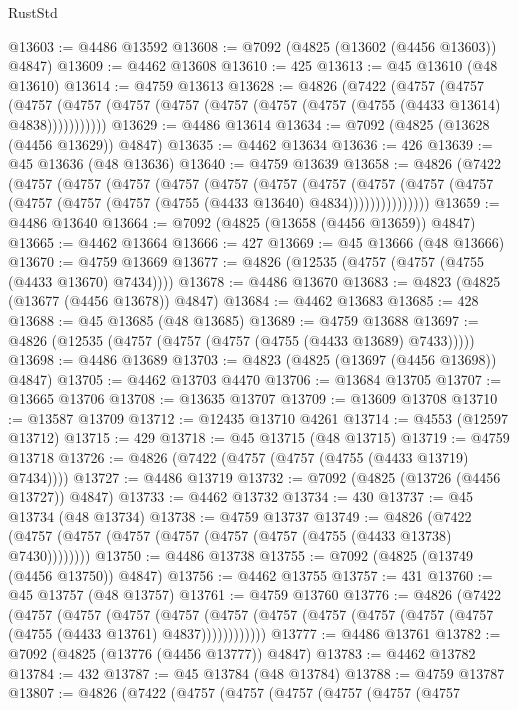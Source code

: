 \begin{lexlean}{RustStd}
\begin{coremodule}
@13603 := @4486 @13592
@13608 := @7092 (@4825 (@13602 (@4456 @13603)) @4847)
@13609 := @4462 @13608
@13610 := 425
@13613 := @45 @13610 (@48 @13610)
@13614 := @4759 @13613
@13628 := @4826
    (@7422
      (@4757
        (@4757
          (@4757 (@4757 (@4757 (@4757 (@4757 (@4757 (@4757 (@4755 (@4433 @13614) @4838)))))))))))
@13629 := @4486 @13614
@13634 := @7092 (@4825 (@13628 (@4456 @13629)) @4847)
@13635 := @4462 @13634
@13636 := 426
@13639 := @45 @13636 (@48 @13636)
@13640 := @4759 @13639
@13658 := @4826
    (@7422
      (@4757
        (@4757
          (@4757
            (@4757
              (@4757
                (@4757
                  (@4757
                    (@4757
                      (@4757 (@4757 (@4757 (@4757 (@4757 (@4755 (@4433 @13640) @4834)))))))))))))))
@13659 := @4486 @13640
@13664 := @7092 (@4825 (@13658 (@4456 @13659)) @4847)
@13665 := @4462 @13664
@13666 := 427
@13669 := @45 @13666 (@48 @13666)
@13670 := @4759 @13669
@13677 := @4826 (@12535 (@4757 (@4757 (@4755 (@4433 @13670) @7434))))
@13678 := @4486 @13670
@13683 := @4823 (@4825 (@13677 (@4456 @13678)) @4847)
@13684 := @4462 @13683
@13685 := 428
@13688 := @45 @13685 (@48 @13685)
@13689 := @4759 @13688
@13697 := @4826 (@12535 (@4757 (@4757 (@4757 (@4755 (@4433 @13689) @7433)))))
@13698 := @4486 @13689
@13703 := @4823 (@4825 (@13697 (@4456 @13698)) @4847)
@13705 := @4462 @13703 @4470
@13706 := @13684 @13705
@13707 := @13665 @13706
@13708 := @13635 @13707
@13709 := @13609 @13708
@13710 := @13587 @13709
@13712 := @12435 @13710 @4261
@13714 := @4553 (@12597 @13712)
@13715 := 429
@13718 := @45 @13715 (@48 @13715)
@13719 := @4759 @13718
@13726 := @4826 (@7422 (@4757 (@4757 (@4755 (@4433 @13719) @7434))))
@13727 := @4486 @13719
@13732 := @7092 (@4825 (@13726 (@4456 @13727)) @4847)
@13733 := @4462 @13732
@13734 := 430
@13737 := @45 @13734 (@48 @13734)
@13738 := @4759 @13737
@13749 := @4826 (@7422 (@4757 (@4757 (@4757 (@4757 (@4757 (@4757 (@4755 (@4433 @13738) @7430))))))))
@13750 := @4486 @13738
@13755 := @7092 (@4825 (@13749 (@4456 @13750)) @4847)
@13756 := @4462 @13755
@13757 := 431
@13760 := @45 @13757 (@48 @13757)
@13761 := @4759 @13760
@13776 := @4826
    (@7422
      (@4757
        (@4757
          (@4757
            (@4757 (@4757 (@4757 (@4757 (@4757 (@4757 (@4757 (@4755 (@4433 @13761) @4837))))))))))))
@13777 := @4486 @13761
@13782 := @7092 (@4825 (@13776 (@4456 @13777)) @4847)
@13783 := @4462 @13782
@13784 := 432
@13787 := @45 @13784 (@48 @13784)
@13788 := @4759 @13787
@13807 := @4826
    (@7422
      (@4757
        (@4757
          (@4757
            (@4757
              (@4757
                (@4757

\end{coremodule}
\end{lexlean}
